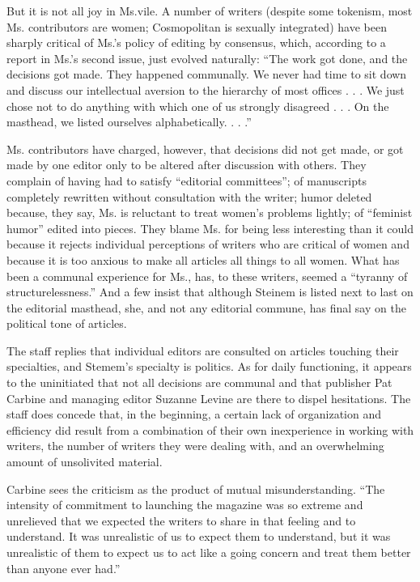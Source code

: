 But it is not all joy in Ms.vile. A number of writers (despite some
tokenism, most Ms. contributors are women; Cosmopolitan is sexually
integrated) have been sharply critical of Ms.'s policy of editing by
consensus, which, according to a report in Ms.'s second issue, just
evolved naturally: ``The work got done, and the decisions got made. They
happened communally. We never had time to sit down and discuss our
intellectual aversion to the hierarchy of most offices . . . We just
chose not to do anything with which one of us strongly disagreed . . .
On the masthead, we listed ourselves alphabetically. . . .''

Ms. contributors have charged, however, that decisions did not get made,
or got made by one editor only to be altered after discussion with
others. They complain of having had to satisfy ``editorial committees'';
of manuscripts completely rewritten without consultation with the
writer; humor deleted because, they say, Ms. is reluctant to treat
women's problems lightly; of ``feminist humor'' edited into pieces. They
blame Ms. for being less interesting than it could because it rejects
individual perceptions of writers who are critical of women and because
it is too anxious to make all articles all things to all women. What has
been a communal experience for Ms., has, to these writers, seemed a
``tyranny of structurelessness.'' And a few insist that although Steinem
is listed next to last on the editorial masthead, she, and not any
editorial commune, has final say on the political tone of articles.

The staff replies that individual editors are consulted on articles
touching their specialties, and Stemem's specialty is politics. As for
daily functioning, it appears to the uninitiated that not all decisions
are communal and that publisher Pat Carbine and managing editor Suzanne
Levine are there to dispel hesitations. The staff does concede that, in
the beginning, a certain lack of organization and efficiency did result
from a combination of their own inexperience in working with writers,
the number of writers they were dealing with, and an overwhelming amount
of unsolivited material.

Carbine sees the criticism as the product of mutual misunderstanding.
``The intensity of commitment to launching the magazine was so extreme
and unrelieved that we expected the writers to share in that feeling and
to understand. It was unrealistic of us to expect them to understand,
but it was unrealistic of them to expect us to act like a going concern
and treat them better than anyone ever had.''

